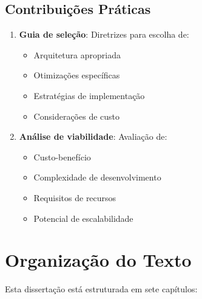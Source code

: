 \subsection{Contribuições Práticas}
\begin{enumerate}
    \item \textbf{Guia de seleção}: Diretrizes para escolha de:
    \begin{itemize}
        \item Arquitetura apropriada
        \item Otimizações específicas
        \item Estratégias de implementação
        \item Considerações de custo
    \end{itemize}
    
    \item \textbf{Análise de viabilidade}: Avaliação de:
    \begin{itemize}
        \item Custo-benefício
        \item Complexidade de desenvolvimento
        \item Requisitos de recursos
        \item Potencial de escalabilidade
    \end{itemize}
\end{enumerate}

\section{Organização do Texto}\label{sec:organizacao}

Esta dissertação está estruturada em sete capítulos:


